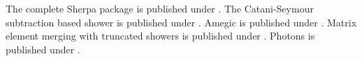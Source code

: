 \documentclass{article}
\begin{document}
The complete Sherpa package is published under \cite{Gleisberg:2008ta}.
The Catani-Seymour subtraction based shower is published under \cite{Schumann:2007mg}.
Amegic is published under \cite{Krauss:2001iv}.
Matrix element merging with truncated showers is published under \cite{Hoeche:2009rj}.
Photons is published under \cite{Schonherr:2008av}.
\end{document}
